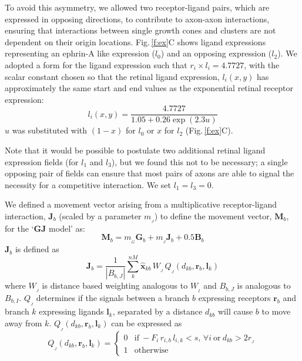 \documentclass[11pt, a4paper]{article}
\begin{document}
To avoid this asymmetry, we allowed two receptor-ligand pairs, which are
expressed in opposing directions, to contribute to axon-axon interactions,
ensuring that interactions between single growth cones and clusters are not
dependent on their origin locations. Fig.\,\ref{f:ex}C shows ligand
expressions representing an ephrin-A like expression ($l_0$) and an opposing
expression ($l_2$). We adopted a form for the ligand expression such that
$r_i \times l_i = 4.7727$, with the scalar constant chosen so that the retinal
ligand expression, $l_i(x,y)$ has approximately the same start and end values
as the exponential retinal receptor expression:
%
\begin{equation}
 \label{e:retligexp}
l_i(x,y) = \frac{4.7727}{1.05 + 0.26 \exp (2.3 u)}
\end{equation}
$u$ was substituted with $(1-x)$ for $l_0$ or $x$ for $l_2$ (Fig.\,\ref{f:ex}C).
%

Note that it would be possible to postulate two additional retinal ligand
expression fields (for $l_1$ and $l_3$), but we found this not to be
necessary; a single opposing pair of fields can ensure that most pairs of
axons are able to signal the necessity for a competitive interaction. We set
$l_1 = l_3 = 0$.

We defined a movement vector arising from a multiplicative receptor-ligand
interaction, $\mathbf{J}_b$ (scaled by a parameter $m_{\!_J}$) to define the
movement vector, $\mathbf{M}_b$, for the `$\mathbf{GJ}$ model' as:
%
\begin{equation} \label{e:mv3}
 \mathbf{M}_{b} = m_{\!_G} \mathbf{G}_b + m_{\!_J} \mathbf{J}_b + 0.5 \mathbf{B}_b
\end{equation}
%
%
$\mathbf{J}_b$ is defined as
%
\begin{equation}
\mathbf{J}_b = \frac{1}{|B_{b,J}|} \sum_k^{nM} \hat{\mathbf{x}}_{kb}\,W_{\!_J}\,Q_{\!_J}(d_{kb}, \mathbf{r}_{b}, \mathbf{l}_{k})
\end{equation}
%
where $W_{\!_J}$ is distance based weighting analogous to $W_{\!_I}$ and
$B_{b,J}$ is analogous to $B_{b,I}$. $Q_{\!_J}$ determines if the signals
between a branch $b$ expressing receptors $\mathbf{r}_b$ and branch $k$
expressing ligands $\mathbf{l}_k$, separated by a distance $d_{kb}$ will cause
$b$ to move away from $k$. $Q_{\!_J}(d_{kb}, \mathbf{r}_{b}, \mathbf{l}_{k})$
can be expressed as
%
\begin{equation}
Q_{\!_J}(d_{kb}, \mathbf{r}_{b}, \mathbf{l}_{k}) = \begin{cases}
                 0 & \mathrm{if}~-F_i\,r_{i,b}\,l_{i,k} <
                 s,\,\forall{i}~\mathrm{or}~d_{kb} > 2r_{\!_J} \\
                 1 & \mathrm{otherwise}
     \end{cases}
\end{equation}
\end{document}
